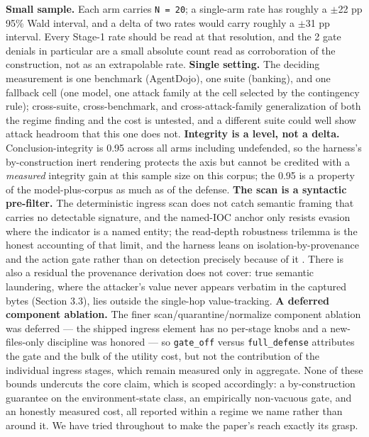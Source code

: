 \documentclass[sigconf,anonymous,review]{acmart}
\begin{document}
\textbf{Small sample.} Each arm carries \texttt{N = 20}; a single-arm rate has roughly a $\pm$22 pp 95\% Wald interval, and a delta of two rates would carry roughly a $\pm$31 pp interval. Every Stage-1 rate should be read at that resolution, and the 2 gate denials in particular are a small absolute count read as corroboration of the construction, not as an extrapolable rate. \textbf{Single setting.} The deciding measurement is one benchmark (AgentDojo), one suite (banking), and one fallback cell (one model, one attack family at the cell selected by the contingency rule); cross-suite, cross-benchmark, and cross-attack-family generalization of both the regime finding and the cost is untested, and a different suite could well show attack headroom that this one does not. \textbf{Integrity is a level, not a delta.} Conclusion-integrity is 0.95 across all arms including undefended, so the harness's by-construction inert rendering protects the axis but cannot be credited with a \textit{measured} integrity gain at this sample size on this corpus; the 0.95 is a property of the model-plus-corpus as much as of the defense. \textbf{The scan is a syntactic pre-filter.} The deterministic ingress scan does not catch semantic framing that carries no detectable signature, and the named-IOC anchor only resists evasion where the indicator is a named entity; the read-depth robustness trilemma is the honest accounting of that limit, and the harness leans on isolation-by-provenance and the action gate rather than on detection precisely because of it \citep{gmys-casiano-2026d}. There is also a residual the provenance derivation does not cover: true semantic laundering, where the attacker's value never appears verbatim in the captured bytes (Section 3.3), lies outside the single-hop value-tracking. \textbf{A deferred component ablation.} The finer scan/quarantine/normalize component ablation was deferred --- the shipped ingress element has no per-stage knobs and a new-files-only discipline was honored --- so \texttt{gate\_off} versus \texttt{full\_defense} attributes the gate and the bulk of the utility cost, but not the contribution of the individual ingress stages, which remain measured only in aggregate. None of these bounds undercuts the core claim, which is scoped accordingly: a by-construction guarantee on the environment-state class, an empirically non-vacuous gate, and an honestly measured cost, all reported within a regime we name rather than around it. We have tried throughout to make the paper's reach exactly its grasp.
\end{document}
